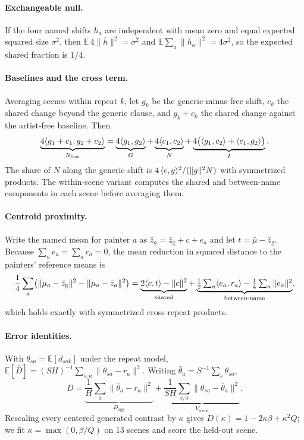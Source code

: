 \paragraph{Exchangeable null.} If the four named shifts $h_a$ are independent with mean zero and
equal expected squared size $\sigma^2$, then $\mathbb E\,4\|\bar h\|^2=\sigma^2$ and $\mathbb
E\sum_a\|h_a\|^2=4\sigma^2$, so the expected shared fraction is $1/4$.

\paragraph{Baselines and the cross term.} Averaging scenes within repeat $k$, let $g_k$ be the
generic-minus-free shift, $c_k$ the shared change beyond the generic clause, and $g_k+c_k$ the
shared change against the artist-free baseline. Then
\begin{equation}
\underbrace{4\langle g_1+c_1,g_2+c_2\rangle}_{N_{\mathrm{free}}}=\underbrace{4\langle g_1,g_2\rangle}_{G}
+\underbrace{4\langle c_1,c_2\rangle}_{N}
+\underbrace{4\bigl(\langle g_1,c_2\rangle+\langle c_1,g_2\rangle\bigr)}_{I}.
\end{equation}
The share of $N$ along the generic shift is $4\,\langle c,g\rangle^2/(\|g\|^2N)$ with symmetrized
products. The within-scene variant computes the shared and between-name components in each
scene before averaging them.

\paragraph{Centroid proximity.} Write the named mean for painter $a$ as $\bar z_a=\bar
z_{\mathrm{g}}+c+e_a$ and let $t=\bar\mu-\bar z_{\mathrm{g}}$. Because $\sum_ae_a=\sum_ar_a=0$,
the mean reduction in squared distance to the painters' reference means is
\begin{equation}
\frac14\sum_a\bigl(\|\mu_a-\bar z_{\mathrm{g}}\|^2-\|\mu_a-\bar z_a\|^2\bigr)
=\underbrace{2\langle c,t\rangle-\|c\|^2}_{\text{shared}}
+\underbrace{\tfrac12\textstyle\sum_a\langle e_a,r_a\rangle-\tfrac14\sum_a\|e_a\|^2}_{\text{between-name}},
\end{equation}
which holds exactly with symmetrized cross-repeat products.

\paragraph{Error identities.} With $\theta_{sa}=\mathbb E[d_{sak}]$ under the repeat model,
$\mathbb E[\widehat D]=(SH)^{-1}\sum_{s,a}\|\theta_{sa}-r_a\|^2$. Writing
$\bar\theta_a=S^{-1}\sum_s\theta_{sa}$,
\begin{equation}
D=\underbrace{\frac1H\sum_a\|\bar\theta_a-r_a\|^2}_{D_{\mathrm{agg}}}
+\underbrace{\frac{1}{SH}\sum_{s,a}\|\theta_{sa}-\bar\theta_a\|^2}_{V_{\mathrm{scene}}}.
\end{equation}
Rescaling every centered generated contrast by $\kappa$ gives $D(\kappa)=1-2\kappa\beta+\kappa^2Q$;
we fit $\kappa=\max(0,\beta/Q)$ on 13 scenes and score the held-out scene.

